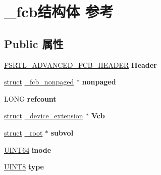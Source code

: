 \hypertarget{struct__fcb}{}\section{\+\_\+fcb结构体 参考}
\label{struct__fcb}
\subsection*{Public 属性}
\begin{DoxyCompactItemize}
\item 
\mbox{\label{struct__fcb_afc9bf1802b1a0c5d4dc606c2dde03ba0}} 
\hyperlink{struct___f_s_r_t_l___a_d_v_a_n_c_e_d___f_c_b___h_e_a_d_e_r}{F\+S\+R\+T\+L\+\_\+\+A\+D\+V\+A\+N\+C\+E\+D\+\_\+\+F\+C\+B\+\_\+\+H\+E\+A\+D\+ER} {\bfseries Header}
\item 
\mbox{\label{struct__fcb_ae88f45fe049abb7e2d5c2a1895cfa01c}} 
\hyperlink{interfacestruct}{struct} \hyperlink{struct__fcb__nonpaged}{\+\_\+fcb\+\_\+nonpaged} $\ast$ {\bfseries nonpaged}
\item 
\mbox{\label{struct__fcb_acac36be52186bfb4fe1d6fbf7cf75ab4}} 
L\+O\+NG {\bfseries refcount}
\item 
\mbox{\label{struct__fcb_a92d311d4ece1206b920aabd506a8cc96}} 
\hyperlink{interfacestruct}{struct} \hyperlink{struct__device__extension}{\+\_\+device\+\_\+extension} $\ast$ {\bfseries Vcb}
\item 
\mbox{\label{struct__fcb_aa5c18b9a41b4bcc3d363dae20e9c484c}} 
\hyperlink{interfacestruct}{struct} \hyperlink{struct__root}{\+\_\+root} $\ast$ {\bfseries subvol}
\item 
\mbox{\label{struct__fcb_a47b872eed8848ae7533f271dbb7d4052}} 
\hyperlink{_processor_bind_8h_a57be03562867144161c1bfee95ca8f7c}{U\+I\+N\+T64} {\bfseries inode}
\item 
\mbox{\label{struct__fcb_a90b1f1da6f0c83342ebc1b0f762fcd6d}} 
\hyperlink{_processor_bind_8h_ab27e9918b538ce9d8ca692479b375b6a}{U\+I\+N\+T8} {\bfseries type}
\item 
\mbox{\label{struct__fcb_a775ae6af2d8ceed62462438242936cf8}} 

\end{DoxyCompactItemize}
